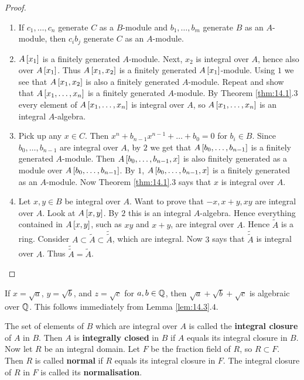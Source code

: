 \begin{proof}
\hfill
\begin{enumerate}
\item If $ c_1, \dots, c_n $ generate $ C $ as a $ B $-module and $ b_1, \dots, b_m $ generate $ B $ as an $ A $-module, then $ c_ib_j $ generate $ C $ as an $ A $-module.
\item $ A\sbr{x_1} $ is a finitely generated $ A $-module. Next, $ x_2 $ is integral over $ A $, hence also over $ A\sbr{x_1} $. Thus $ A\sbr{x_1, x_2} $ is a finitely generated $ A\sbr{x_1} $-module. Using $ 1 $ we see that $ A\sbr{x_1, x_2} $ is also a finitely generated $ A $-module. Repeat and show that $ A\sbr{x_1, \dots, x_n} $ is a finitely generated $ A $-module. By Theorem \ref{thm:14.1}.$ 3 $ every element of $ A\sbr{x_1, \dots, x_n} $ is integral over $ A $, so $ A\sbr{x_1, \dots, x_n} $ is an integral $ A $-algebra.
\item Pick up any $ x \in C $. Then $ x^n + b_{n - 1}x^{n - 1} + \dots + b_0 = 0 $ for $ b_i \in B $. Since $ b_0, \dots, b_{n - 1} $ are integral over $ A $, by $ 2 $ we get that $ A\sbr{b_0, \dots, b_{n - 1}} $ is a finitely generated $ A $-module. Then $ A\sbr{b_0, \dots, b_{n - 1}, x} $ is also finitely generated as a module over $ A\sbr{b_0, \dots, b_{n - 1}} $. By $ 1 $, $ A\sbr{b_0, \dots, b_{n - 1}, x} $ is a finitely generated as an $ A $-module. Now Theorem \ref{thm:14.1}.$ 3 $ says that $ x $ is integral over $ A $.
\item Let $ x, y \in B $ be integral over $ A $. Want to prove that $ -x, x + y, xy $ are integral over $ A $. Look at $ A\sbr{x, y} $. By $ 2 $ this is an integral $ A $-algebra. Hence everything contained in $ A\sbr{x, y} $, such as $ xy $ and $ x + y $, are integral over $ A $. Hence $ \widetilde{A} $ is a ring. Consider $ A \subset \widetilde{A} \subset \widetilde{\widetilde{A}} $, which are integral. Now $ 3 $ says that $ \widetilde{\widetilde{A}} $ is integral over $ A $. Thus $ \widetilde{\widetilde{A}} = \widetilde{A} $.
\end{enumerate}
\end{proof}

\begin{example*}
If $ x = \sqrt{a} $, $ y = \sqrt{b} $, and $ z = \sqrt{c} $ for $ a, b \in \mathbb{Q} $, then $ \sqrt{a} + \sqrt{b} + \sqrt{c} $ is algebraic over $ \mathbb{Q} $. This follows immediately from Lemma \ref{lem:14.3}.$ 4 $.
\end{example*}

\begin{definition}
The set of elements of $ B $ which are integral over $ A $ is called the \textbf{integral closure} of $ A $ in $ B $. Then $ A $ is \textbf{integrally closed} in $ B $ if $ A $ equals its integral closure in $ B $. Now let $ R $ be an integral domain. Let $ F $ be the fraction field of $ R $, so $ R \subset F $. Then $ R $ is called \textbf{normal} if $ R $ equals its integral closure in $ F $. The integral closure of $ R $ in $ F $ is called its \textbf{normalisation}.
\end{definition}

